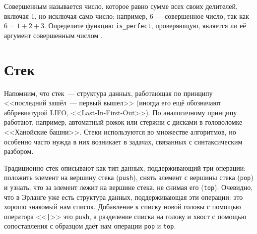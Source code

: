 \documentclass[
  paper=a4,
  fontsize=14pt,
  openany,
  appendixprefix=true
]{scrbook}
\begin{document}
\begin{problem}\label{perfect}
Совершенным называется число, которое равно сумме всех своих делителей, включая 1, но исключая само число; например, 6 — совершенное число, так как $6 = 1 + 2 + 3$. Определите функцию \lstinline{is_perfect}, проверяющую, является ли её аргумент совершенным числом \cite[2.5.6]{Harper}.
\end{problem}

\section{Стек}

Напомним, что стек~--- структура данных, работающая по принципу <<последний зашёл~--- первый вышел>> (иногда его ещё обозначают аббревиатурой LIFO, <<Last-In-First-Out>>). По аналогичному принципу работают, например, автоматный рожок или стержни с дисками в головоломке <<Ханойские башни>>. Стеки используются во множестве алгоритмов, но особенно часто нужда в них возникает в задачах, связанных с синтаксическим разбором.

Традиционно стек описывают как тип данных, поддерживающий три операции: положить элемент на вершину стека (\lstinline{push}), снять элемент с вершины стека (\lstinline{pop}) и узнать, что за элемент лежит на вершине стека, не снимая его (\lstinline{top}). Очевидно, что в Эрланге уже есть структура данных, поддерживающая эти операции: это хорошо знакомый нам список. Добавление к списку новой головы с помощью оператора <<\lstinline{|}>> это \lstinline{push}, а разделение списка на голову и хвост с помощью сопоставления с образцом даёт нам операции \lstinline{pop} и \lstinline{top}. 
\end{document}
